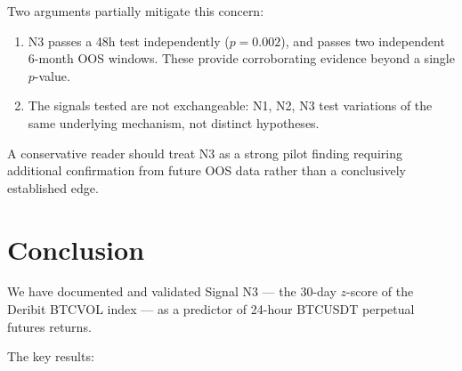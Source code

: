 \documentclass[12pt, a4paper]{article}
\theoremstyle{plain}
\theoremstyle{definition}
\begin{document}
Two arguments partially mitigate this concern:
\begin{enumerate}
  \item N3 passes a 48h test independently ($p = 0.002$), and passes two
        independent 6-month OOS windows. These provide corroborating
        evidence beyond a single $p$-value.
  \item The signals tested are not exchangeable: N1, N2, N3 test
        variations of the same underlying mechanism, not distinct
        hypotheses.
\end{enumerate}

A conservative reader should treat N3 as a strong pilot finding requiring
additional confirmation from future OOS data rather than a conclusively
established edge.


\section{Conclusion}
\label{sec:conclusion}

We have documented and validated Signal N3 --- the 30-day $z$-score of the
Deribit BTCVOL index --- as a predictor of 24-hour BTCUSDT perpetual futures
returns.

The key results:
\end{document}
